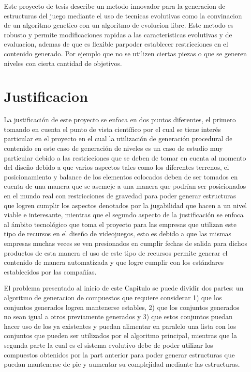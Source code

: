 Este proyecto de tesis describe un metodo innovador para la generacion de
estructuras del juego mediante el uso de tecnicas evolutivas como la convinacion
de un algoritmo genetico con un algoritmo de evolucion libre. Este metodo es
robusto y permite modificaciones rapidas a las caracteristicas evolutivas y de
evaluacion, ademas de que es flexible parpoder establecer restricciones en el
contenido generado. Por ejemplo que no se utilizen ciertas piezas o que se
generen niveles con cierta cantidad de objetivos.

\section{Justificacion}
\label{section:justification}

La justificación de este proyecto se enfoca en dos puntos diferentes, el primero
tomando en cuenta el punto de vista científico por el cual se tiene interés
particular en el proyecto en el cual la utilización de generación procedural de
contenido en este caso de generación de niveles es un caso de estudio muy
particular debido a las restricciones que se deben de tomar en cuenta al momento
del diseño debido a que varios aspectos tales como los diferentes terrenos, el
posicionamiento y balance de los elementos colocados deben de ser tomados en
cuenta de una manera que se asemeje a una manera que podrían ser posicionados en
el mundo real con restricciones de gravedad para poder generar estructuras que
logren cumplir los aspectos denotados por la jugabilidad que hacen a un nivel
viable e interesante, mientras que el segundo aspecto de la justificación se
enfoca al ámbito tecnológico que toma el proyecto para las empresas que utilizan
este tipo de recursos en el diseño de videojuegos, esto es debido a que las
mismas empresas muchas veces se ven presionados en cumplir fechas de salida para
dichos productos de esta manera el uso de este tipo de recursos permite generar
el contenido de manera automatizada y que logre cumplir con los estándares
establecidos por las compañías.

El problema presentado al inicio de este Capitulo se puede dividir dos partes:
un algoritmo de generacion de compuestos que requiere considerar 1) que los
conjuntos generados logren mantenerse estables, 2) que los conjuntos generados
no sean igual a otros previamente generados y 3) que estos conjuntos puedan
hacer uso de los ya existentes y puedan alimentar en paralelo una lista con los
conjuntos que pueden ser utilizados por el algoritmo principal, mientras que la
segunda parte la cual es el sistema evolutivo debe de poder utilizar los
compuestos obtenidos por la part anterior para poder generar estructuras que
puedan mantenerse de pie y aumentar su complejidad mediante las estructuras.

